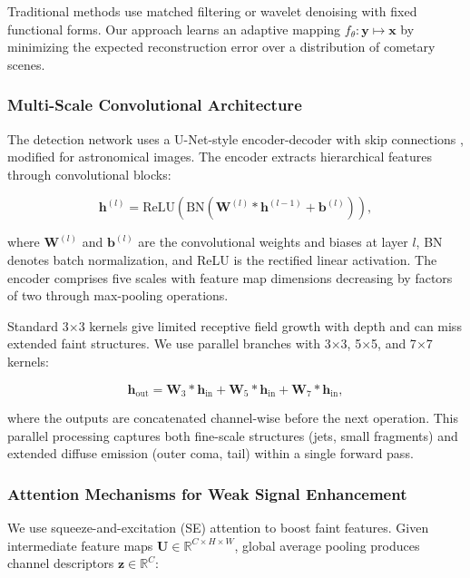\documentclass[preprint2]{aastex631}
\begin{document}
Traditional methods use matched filtering or wavelet denoising with fixed functional forms. Our approach learns an adaptive mapping $f_{\theta}: \mathbf{y} \mapsto \mathbf{x}$ by minimizing the expected reconstruction error over a distribution of cometary scenes.

\subsubsection{Multi-Scale Convolutional Architecture}

The detection network uses a U-Net-style encoder-decoder with skip connections \citep{ronneberger15}, modified for astronomical images. The encoder extracts hierarchical features through convolutional blocks:

\begin{equation}\label{eq:conv_block}
\mathbf{h}^{(l)} = \text{ReLU}\left(\text{BN}\left(\mathbf{W}^{(l)} * \mathbf{h}^{(l-1)} + \mathbf{b}^{(l)}\right)\right),
\end{equation}

where $\mathbf{W}^{(l)}$ and $\mathbf{b}^{(l)}$ are the convolutional weights and biases at layer $l$, BN denotes batch normalization, and ReLU is the rectified linear activation. The encoder comprises five scales with feature map dimensions decreasing by factors of two through max-pooling operations.

Standard 3$\times$3 kernels give limited receptive field growth with depth and can miss extended faint structures. We use parallel branches with 3$\times$3, 5$\times$5, and 7$\times$7 kernels:

\begin{equation}\label{eq:multi_kernel}
\mathbf{h}_{\text{out}} = \mathbf{W}_3 * \mathbf{h}_{\text{in}} + \mathbf{W}_5 * \mathbf{h}_{\text{in}} + \mathbf{W}_7 * \mathbf{h}_{\text{in}},
\end{equation}

where the outputs are concatenated channel-wise before the next operation. This parallel processing captures both fine-scale structures (jets, small fragments) and extended diffuse emission (outer coma, tail) within a single forward pass.

\subsubsection{Attention Mechanisms for Weak Signal Enhancement}

We use squeeze-and-excitation (SE) attention \citep{hu18} to boost faint features. Given intermediate feature maps $\mathbf{U} \in \mathbb{R}^{C \times H \times W}$, global average pooling produces channel descriptors $\mathbf{z} \in \mathbb{R}^{C}$:
\end{document}
